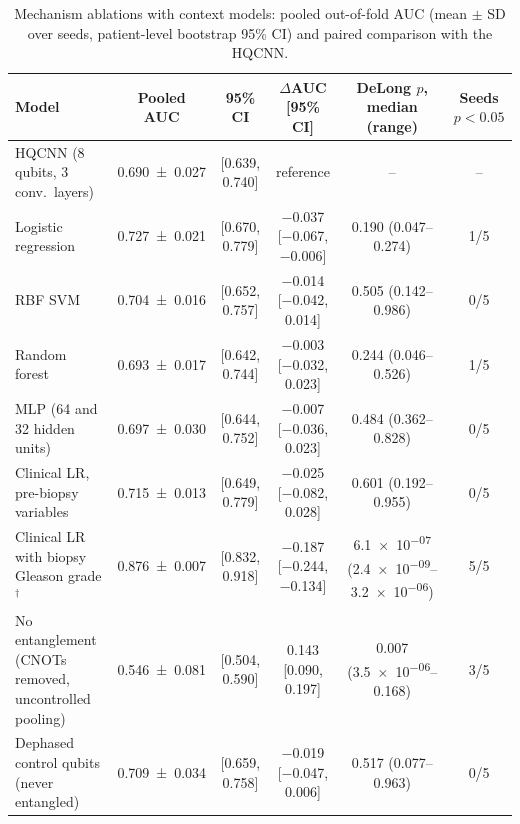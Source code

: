 \begin{table}[tbp]
\centering
\caption{Mechanism ablations with context models: pooled out-of-fold AUC (mean $\pm$ SD over seeds, patient-level bootstrap 95\% CI) and paired comparison with the HQCNN.}
\label{tab:s_p2_comparisons}
\scriptsize\setlength{\tabcolsep}{3pt}
\begin{tabular}{>{\raggedright\arraybackslash}p{3.6cm}ccccc}
\toprule
Model & Pooled AUC & 95\% CI & $\Delta$AUC [95\% CI] & DeLong $p$, median (range) & Seeds $p<0.05$ \\
\midrule
HQCNN (8 qubits, 3 conv.\ layers) & \num{0.690 \pm 0.027} & [\num{0.639}, \num{0.740}] & reference & -- & -- \\
Logistic regression & \num{0.727 \pm 0.021} & [\num{0.670}, \num{0.779}] & \num{-0.037} [\num{-0.067}, \num{-0.006}] & \num{0.190} (\num{0.047}--\num{0.274}) & \num{1}/\num{5} \\
RBF SVM & \num{0.704 \pm 0.016} & [\num{0.652}, \num{0.757}] & \num{-0.014} [\num{-0.042}, \num{+0.014}] & \num{0.505} (\num{0.142}--\num{0.986}) & \num{0}/\num{5} \\
Random forest & \num{0.693 \pm 0.017} & [\num{0.642}, \num{0.744}] & \num{-0.003} [\num{-0.032}, \num{+0.023}] & \num{0.244} (\num{0.046}--\num{0.526}) & \num{1}/\num{5} \\
MLP (64 and 32 hidden units) & \num{0.697 \pm 0.030} & [\num{0.644}, \num{0.752}] & \num{-0.007} [\num{-0.036}, \num{+0.023}] & \num{0.484} (\num{0.362}--\num{0.828}) & \num{0}/\num{5} \\
Clinical LR, pre-biopsy variables & \num{0.715 \pm 0.013} & [\num{0.649}, \num{0.779}] & \num{-0.025} [\num{-0.082}, \num{+0.028}] & \num{0.601} (\num{0.192}--\num{0.955}) & \num{0}/\num{5} \\
Clinical LR with biopsy Gleason grade$^{\dagger}$ & \num{0.876 \pm 0.007} & [\num{0.832}, \num{0.918}] & \num{-0.187} [\num{-0.244}, \num{-0.134}] & \num{6.1e-07} (\num{2.4e-09}--\num{3.2e-06}) & \num{5}/\num{5} \\
No entanglement (CNOTs removed, uncontrolled pooling) & \num{0.546 \pm 0.081} & [\num{0.504}, \num{0.590}] & \num{+0.143} [\num{+0.090}, \num{+0.197}] & \num{0.007} (\num{3.5e-06}--\num{0.168}) & \num{3}/\num{5} \\
Dephased control qubits (never entangled) & \num{0.709 \pm 0.034} & [\num{0.659}, \num{0.758}] & \num{-0.019} [\num{-0.047}, \num{+0.006}] & \num{0.517} (\num{0.077}--\num{0.963}) & \num{0}/\num{5} \\

\end{tabular}
\end{table}
